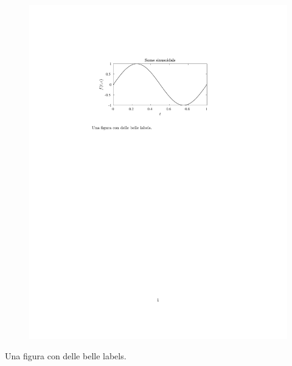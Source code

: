\documentclass{article}
\begin{document}
	\begin{figure}[t]
		\centering
		\includegraphics[]{test}
	\end{figure}
	Una figura con delle belle labels.
\end{document}
